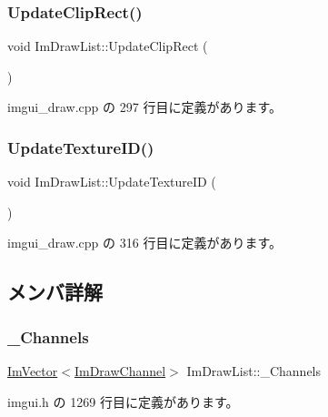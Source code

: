 \subsubsection{\texorpdfstring{Update\+Clip\+Rect()}{UpdateClipRect()}}
{\footnotesize\ttfamily void Im\+Draw\+List\+::\+Update\+Clip\+Rect (\begin{DoxyParamCaption}{ }\end{DoxyParamCaption})}



 imgui\+\_\+draw.\+cpp の 297 行目に定義があります。

\mbox{\label{struct_im_draw_list_a58998853ed37538ae5a638da032b0005}} 
\subsubsection{\texorpdfstring{Update\+Texture\+I\+D()}{UpdateTextureID()}}
{\footnotesize\ttfamily void Im\+Draw\+List\+::\+Update\+Texture\+ID (\begin{DoxyParamCaption}{ }\end{DoxyParamCaption})}



 imgui\+\_\+draw.\+cpp の 316 行目に定義があります。



\subsection{メンバ詳解}
\mbox{\label{struct_im_draw_list_ae6be941728e5b2c81a03c78e4aa22629}} 
\subsubsection{\texorpdfstring{\+\_\+\+Channels}{\_Channels}}
{\footnotesize\ttfamily \mbox{\hyperlink{class_im_vector}{Im\+Vector}}$<$\mbox{\hyperlink{struct_im_draw_channel}{Im\+Draw\+Channel}}$>$ Im\+Draw\+List\+::\+\_\+\+Channels}



 imgui.\+h の 1269 行目に定義があります。

